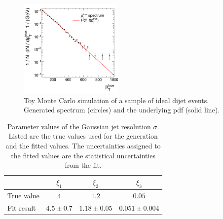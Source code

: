 \begin{figure}[ht]
  \centering
  \includegraphics[width=0.45\textwidth]{figures/resFit_ToyMC_PtGenCuts_SpectrumLog}
  \caption{Toy Monte Carlo simulation of a sample of ideal dijet events.
    Generated \pttrue spectrum (circles) and the underlying pdf (solid line).}
  \label{fig:ResFit:App:ToyMC:Spectrum}
\end{figure}

\begin{table}[ht]
  \caption{Parameter values of the Gaussian jet \pt resolution $\sigma$.
    Listed are the true values used for the generation and the fitted values.
    The uncertainties assigned to the fitted values are the statistical uncertainties from the fit.
    }
  \centering
  \begin{tabular}[ht]{lccc}
    \toprule
     & $\xi_{1}$ & $\xi_{2}$ & $\xi_{3}$ \\
    \midrule
    True value & $4$           & $1.2$           & $0.05$ \\
    Fit result & $4.5 \pm 0.7$ & $1.18 \pm 0.05$ & $0.051 \pm 0.004$ \\
    \bottomrule
  \end{tabular}
  \label{tab:ResFit:ToyMC:FitResult}
\end{table}

